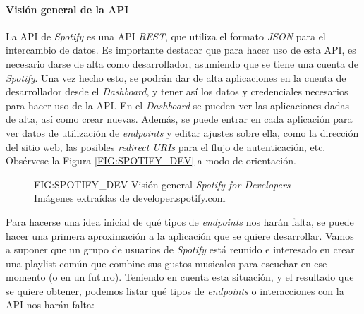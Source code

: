 \paragraph{Visión general de la API\label{subsec:vision_general_api}}

La API de \textit{Spotify} es una API \textit{REST}, que utiliza el formato \textit{JSON} para el intercambio 
de datos. Es importante destacar que para hacer uso de esta API, es necesario darse de alta como desarrollador, asumiendo que se 
tiene una cuenta de \textit{Spotify}. Una vez hecho esto, se podrán dar de alta aplicaciones en la cuenta de desarrollador desde el
\textit{Dashboard}, y tener así los datos y credenciales necesarios para hacer uso de la API. 
En el \textit{Dashboard} se pueden ver las aplicaciones dadas de alta, así como crear nuevas. Además, se puede entrar en cada
aplicación para ver datos de utilización de \textit{endpoints} y editar ajustes sobre ella, como la dirección del sitio web,
las posibles \textit{redirect URIs} para el flujo de autenticación, etc.
Obsérvese la Figura \ref{FIG:SPOTIFY_DEV} a modo de orientación.

\begin{figure}[Visión general \textit{Spotify for Developers}]{FIG:SPOTIFY_DEV}
    {Visión general \textit{Spotify for Developers} \\
    {\scriptsize Imágenes extraídas de \href{https://developer.spotify.com/dashboard/}{developer.spotify.com}}}
     \quad
     \quad
\end{figure}

Para hacerse una idea inicial de qué tipos de \textit{endpoints} nos harán falta, se puede hacer una primera aproximación
a la aplicación que se quiere desarrollar. Vamos a suponer que un grupo de usuarios de \textit{Spotify} está 
reunido e interesado en crear una playlist común que combine sus gustos musicales para escuchar en ese momento
(o en un futuro). Teniendo en cuenta esta situación, y el resultado que se quiere obtener, podemos
listar qué tipos de \textit{endpoints} o interacciones con la API nos harán falta:

